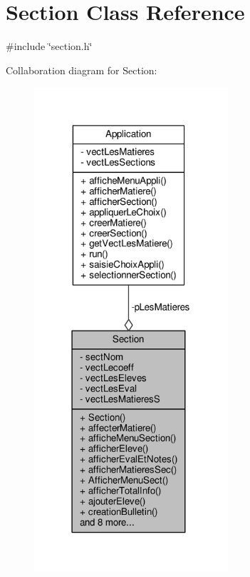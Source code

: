 \hypertarget{classSection}{\section{Section Class Reference}
\label{classSection}
}


{\ttfamily \#include \char`\"{}section.\+h\char`\"{}}



Collaboration diagram for Section\+:
\nopagebreak
\begin{figure}[H]
\begin{center}
\leavevmode
\includegraphics[width=204pt]{classSection__coll__graph}
\end{center}
\end{figure}
